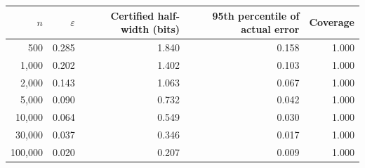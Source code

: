 \begin{tabular}{@{}r r r r r@{}}
\toprule
$n$ & $\varepsilon$ & Certified half-width (bits) & 95th percentile of actual error & Coverage \\
\midrule
500 & 0.285 & 1.840 & 0.158 & 1.000 \\
1{,}000 & 0.202 & 1.402 & 0.103 & 1.000 \\
2{,}000 & 0.143 & 1.063 & 0.067 & 1.000 \\
5{,}000 & 0.090 & 0.732 & 0.042 & 1.000 \\
10{,}000 & 0.064 & 0.549 & 0.030 & 1.000 \\
30{,}000 & 0.037 & 0.346 & 0.017 & 1.000 \\
100{,}000 & 0.020 & 0.207 & 0.009 & 1.000 \\
\bottomrule
\end{tabular}